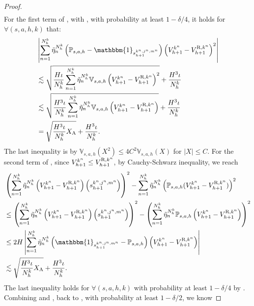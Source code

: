 \documentclass{article}
\newcommand{\R}{\textnormal{R}}
\newcommand{\A}{\textnormal{A}}
\begin{document}
\begin{proof}
\begin{align}
    \end{align}
    For the first term of , with , with probability at least $1-\delta/4$, it holds for $\forall (s,a,h,k)$ that:
    \begin{align}
        \label{i11}
        &\left|\sum_{n= 1}^{N_h^k}\Tilde{\eta}_n^{N_h^k} \left( \mathbb{P}_{s,a,h} - \mathbbm{1}_{s_{h+1}^{k^n,j^n,m^n}}\right)\left(V_{h+1}^{k^n} - V_{h+1}^{\R,k^n}\right)^2\right| \nonumber\\
        &\lesssim \sqrt{\frac{H\iota}{N_h^k} \sum_{n=1}^{N_h^k} \Tilde{\eta}_n^{N_h^k} \mathbb{V}_{s,a,h}\left(V_{h+1}^{k^n} - V_{h+1}^{\R,k^n}\right)^2} + \frac{H^3\iota}{N_h^k}\nonumber\\
        &\lesssim \sqrt{\frac{H^3\iota}{N_h^k}\sum_{n= 1}^{N_h^k}\Tilde{\eta}_n^{N_h^k} \mathbb{V}_{s,a,h}\left(V_{h+1}^{k^n} - V_{h+1}^{\R,k^n}\right)} + \frac{H^3\iota}{N_h^k} \nonumber\\
        & = \sqrt{\frac{H^3\iota}{N_h^k}X_{\A}} + \frac{H^3\iota}{N_h^k}.
    \end{align}
    The last inequality is by $\mathbb{V}_{s,a,h}(X^2) \leq 4C^2\mathbb{V}_{s,a,h}(X)$ for $|X| \leq C$. For the second term of , since $V_{h+1}^{k^n} \leq V_{h+1}^{\R,k^n}$, by Cauchy-Schwarz inequality, we reach
    \begin{align}
        \label{i12}
        &\left(\sum_{n=1}^{N_h^k}\Tilde{\eta}_n^{N_h^k}\left(V_{h+1}^{k^n}-V_{h+1}^{\R,k^n}\right)\left(s_{h+1}^{k^n,j^n,m^n}\right)\right)^2 - \sum_{n= 1}^{N_h^k}\Tilde{\eta}_n^{N_h^k}\left(\mathbb{P}_{s,a,h} (V_{h+1}^{k^n} - V_{h+1}^{\R,k^n})\right)^2 \nonumber\\
        & \leq \left(\sum_{n=1}^{N_h^k}\Tilde{\eta}_n^{N_h^k}\left(V_{h+1}^{k^n}-V_{h+1}^{\R,k^n}\right)\left(s_{h+1}^{k^n,j^n,m^n}\right)\right)^2 - \left(\sum_{n=1}^{N_h^k}\Tilde{\eta}_n^{N_h^k}\mathbb{P}_{s,a,h}\left(V_{h+1}^{k^n}-V_{h+1}^{\R,k^n}\right)\right)^2 \nonumber\\
        & \leq 2H\left|\sum_{n= 1}^{N_h^k}\Tilde{\eta}_n^{N_h^k} \left( \mathbbm{1}_{s_{h+1}^{k^n,j^n,m^n}}-\mathbb{P}_{s,a,h}\right)\left(V_{h+1}^{k^n} - V_{h+1}^{\R,k^n}\right)\right| \nonumber\\
        &\lesssim \sqrt{\frac{H^3\iota}{N_h^k}X_{\A}} + \frac{H^3\iota}{N_h^k}.
    \end{align}
    The last inequality holds for $\forall (s,a,h,k)$ with probability at least $1-\delta/4$ by . Combining  and , back to , with probability at least $1-\delta/2$, we know

\end{proof}
\end{document}

